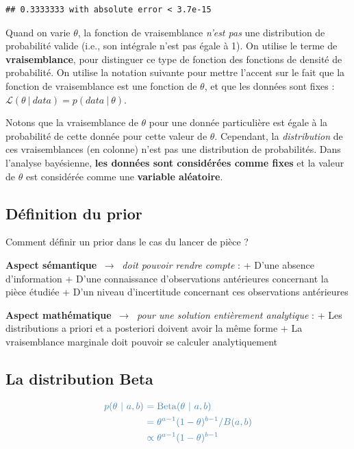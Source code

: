\documentclass[
  a4paper,11pt,twoside,onecolumn,openright,final,oldfontcommands]{memoir}
\theoremstyle{definition}
\theoremstyle{definition}
\theoremstyle{definition}
\theoremstyle{remark}
\begin{document}
\begin{verbatim}
## 0.3333333 with absolute error < 3.7e-15
\end{verbatim}

Quand on varie \(\theta\), la fonction de vraisemblance \emph{n'est pas} une distribution de probabilité valide (i.e., son intégrale n'est pas égale à 1). On utilise le terme de \textbf{vraisemblance}, pour distinguer ce type de fonction des fonctions de densité de probabilité. On utilise la notation suivante pour mettre l'accent sur le fait que la fonction de vraisemblance est une fonction de \(\theta\), et que les données sont fixes : \(\mathcal{L}(\theta \ | \ data) = p(data \ | \ \theta)\).

Notons que la vraisemblance de \(\theta\) pour une donnée particulière est égale à la probabilité de cette donnée pour cette valeur de \(\theta\). Cependant, la \emph{distribution} de ces vraisemblances (en colonne) n'est pas une distribution de probabilités. Dans l'analyse bayésienne, \textbf{les données sont considérées comme fixes} et la valeur de \(\theta\) est considérée comme une \textbf{variable aléatoire}.

\hypertarget{duxe9finition-du-prior}{%
\subsection{Définition du prior}\label{duxe9finition-du-prior}}

Comment définir un prior dans le cas du lancer de pièce ?

\textbf{Aspect sémantique} \(~\rightarrow~\) \emph{doit pouvoir rendre compte} :
+ D'une absence d'information
+ D'une connaissance d'observations antérieures concernant la pièce étudiée
+ D'un niveau d'incertitude concernant ces observations antérieures

\textbf{Aspect mathématique} \(~\rightarrow~\) \emph{pour une solution entièrement analytique} :
+ Les distributions a priori et a posteriori doivent avoir la même forme
+ La vraisemblance marginale doit pouvoir se calculer analytiquement

\hypertarget{la-distribution-beta}{%
\subsection{La distribution Beta}\label{la-distribution-beta}}

\[
\begin{aligned}
\color{steelblue}{p(\theta\ | \ a, b)} \ &\color{steelblue}{= \mathrm{Beta}(\theta\ |\ a, b)} \\
& \color{steelblue}{= \theta^{a - 1}(1 - \theta)^{b - 1} / B(a, b)} \\
& \color{steelblue}{\propto \theta^{a - 1}(1 - \theta)^{b - 1}}
\end{aligned}
\]
\end{document}

